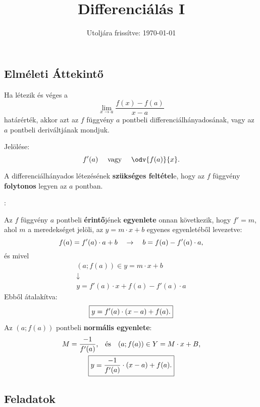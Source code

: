\documentclass[a4paper, 12pt]{scrartcl}
\title{Differenciálás I}
\date{Utoljára frissítve: \today}
\begin{document}
\maketitle

\subsection{Elméleti Áttekintő}

\begin{definition}[Differenciálhányados]
  Ha létezik és véges a
  \[
    \lim_{x \rightarrow a} \frac{f(x) - f(a)}{x - a}
  \]
  határérték, akkor azt az $f$ függvény $a$ pontbeli differenciálhányadosának,
  vagy az $a$ pontbeli deriváltjának mondjuk.

  Jelölése:
  \[
    f'(a)
    \quad \text{ vagy } \quad
    \odv{f(a)}{x}
    \text.
  \]
\end{definition}

\begin{note}
  A differenciálhányados létezésének \textbf{szükséges feltétel}e, hogy az $f$
  függvény \textbf{folytonos} legyen az $a$ pontban.
\end{note}

\begin{blueBox}
  :

  Az $f$ függvény $a$ pontbeli \textbf{érintő}jének \textbf{egyenlete} onnan
  következik, hogy $f' = m$, ahol $m$ a meredekséget jelöli, az $y = m \cdot x
    + b$ egyenes egyenletéből levezetve:
  \[
    f(a) = f'(a) \cdot a + b
    \quad \rightarrow \quad
    b = f(a) - f'(a) \cdot a
    \text,
  \]
  és mivel
  \begin{gather*}
    (a; f(a)) \in y = m \cdot x + b
    \\
    \downarrow
    \\
    y = f'(a) \cdot x + f(a) - f'(a) \cdot a
  \end{gather*}
  Ebből átalakítva:
  \[
    \boxed{
      y = f'(a)\cdot (x-a) + f(a)
      \text.
    }
  \]
  Az $(a; f(a))$ pontbeli \textbf{normális egyenlete}:
  \begin{gather*}
    M = \frac{-1}{f'(a)}
    \text, \quad \text{és} \quad
    (a; f(a)) \in Y = M \cdot x + B
    \text,
    \\
    \boxed{
      y = \frac{-1}{f'(a)} \cdot (x-a) + f(a)
      \text.
    }
  \end{gather*}
\end{blueBox}


\clearpage
\subsection{Feladatok}
\end{document}
